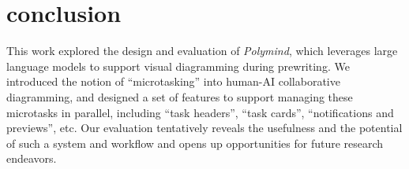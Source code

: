 \section{conclusion}
This work explored the design and evaluation of \textit{Polymind}, which leverages large language models to support visual diagramming during prewriting. We introduced the notion of ``microtasking'' into human-AI collaborative diagramming, and designed a set of features to support managing these microtasks in parallel, including ``task headers'', ``task cards'', ``notifications and previews'', etc. Our evaluation tentatively reveals the usefulness and the potential of such a system and workflow and opens up opportunities for future research endeavors.